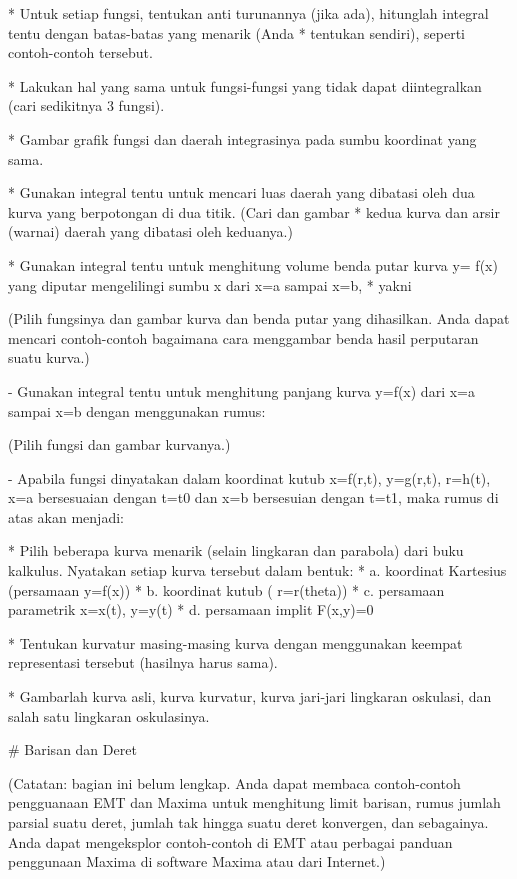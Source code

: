 \documentclass{article}
\begin{document}
* 
Untuk setiap fungsi, tentukan anti turunannya (jika ada), hitunglah integral tentu dengan batas-batas yang menarik (Anda
* tentukan sendiri), seperti contoh-contoh tersebut.

* 
Lakukan hal yang sama untuk fungsi-fungsi yang tidak dapat diintegralkan (cari sedikitnya 3 fungsi).

* 
Gambar grafik fungsi dan daerah integrasinya pada sumbu koordinat yang sama.

* 
Gunakan integral tentu untuk mencari luas daerah yang dibatasi oleh dua kurva yang berpotongan di dua titik. (Cari dan gambar
* kedua kurva dan arsir (warnai) daerah yang dibatasi oleh keduanya.)

* 
Gunakan integral tentu untuk menghitung volume benda putar kurva y= f(x) yang diputar mengelilingi sumbu x dari x=a sampai x=b,
* yakni


(Pilih fungsinya dan gambar kurva dan benda putar yang dihasilkan. Anda dapat mencari contoh-contoh bagaimana cara menggambar
benda hasil perputaran suatu kurva.)


- Gunakan integral tentu untuk menghitung panjang kurva y=f(x) dari x=a sampai x=b dengan menggunakan rumus:


(Pilih fungsi dan gambar kurvanya.)


- Apabila fungsi dinyatakan dalam koordinat kutub x=f(r,t), y=g(r,t), r=h(t), x=a bersesuaian dengan t=t0 dan x=b bersesuian
dengan t=t1, maka rumus di atas akan menjadi:


* 
Pilih beberapa kurva menarik (selain lingkaran dan parabola) dari buku  kalkulus. Nyatakan setiap kurva tersebut dalam bentuk:
*   a. koordinat Kartesius (persamaan y=f(x))
*   b. koordinat kutub ( r=r(theta))
*   c. persamaan parametrik x=x(t), y=y(t)
*   d. persamaan implit F(x,y)=0

* 
Tentukan kurvatur masing-masing kurva dengan menggunakan keempat representasi tersebut (hasilnya harus sama).

* 
Gambarlah kurva asli, kurva kurvatur, kurva jari-jari lingkaran oskulasi, dan salah satu lingkaran oskulasinya.


# Barisan dan Deret

(Catatan: bagian ini belum lengkap. Anda dapat membaca contoh-contoh pengguanaan EMT dan
Maxima untuk menghitung limit barisan, rumus jumlah parsial suatu deret, jumlah tak hingga
suatu deret konvergen, dan sebagainya. Anda dapat mengeksplor contoh-contoh di EMT atau
perbagai panduan penggunaan Maxima di software Maxima atau dari Internet.)
\end{document}
